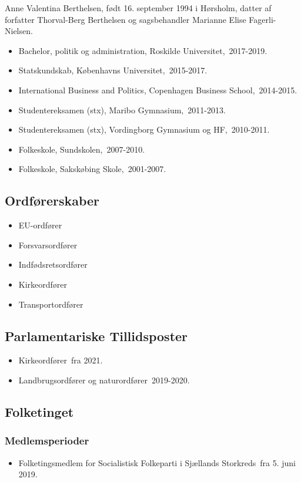 \documentclass[11pt, a4paper]{awesome-cv}
\begin{document}
\makecvheader[R]
\makelettertitle
\begin{cvletter}
Anne Valentina Berthelsen, født 16. september 1994 i Hørsholm, datter af forfatter Thorval-Berg Berthelsen og sagsbehandler Marianne Elise Fagerli-Nielsen.

\begin{itemize}
\item Bachelor, politik og administration, Roskilde Universitet, 2017-2019.
\item Statskundskab, Københavns Universitet, 2015-2017.
\item International Business and Politics, Copenhagen Business School, 2014-2015.
\item Studentereksamen (stx), Maribo Gymnasium, 2011-2013.
\item Studentereksamen (stx), Vordingborg Gymnasium og HF, 2010-2011.
\item Folkeskole, Sundskolen, 2007-2010.
\item Folkeskole, Sakskøbing Skole, 2001-2007.
\end{itemize}
\subsection*{Ordførerskaber}
\begin{itemize}
\item EU-ordfører
\item Forsvarsordfører
\item Indfødsretsordfører
\item Kirkeordfører
\item Transportordfører
\end{itemize}
\subsection*{Parlamentariske Tillidsposter}
\begin{itemize}
\item Kirkeordfører fra 2021.
\item Landbrugsordfører og naturordfører 2019-2020.
\end{itemize}
\subsection*{Folketinget}
\subsubsection*{Medlemsperioder}
\begin{itemize}
\item Folketingsmedlem for Socialistisk Folkeparti i Sjællands Storkreds fra 5. juni 2019.
\end{itemize}

\end{cvletter}
\end{document}

